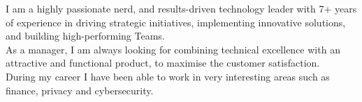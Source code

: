 
\begin{cvparagraph}
    I am a highly passionate nerd, and results-driven technology leader with 7+ years of experience in driving strategic initiatives, implementing innovative solutions, and building high-performing Teams.
    \\As a manager, I am always looking for combining technical excellence with an attractive and functional product, to maximise the customer satisfaction.
    \\During my career I have been able to work in very interesting areas such as finance, privacy and cybersecurity.
\end{cvparagraph}